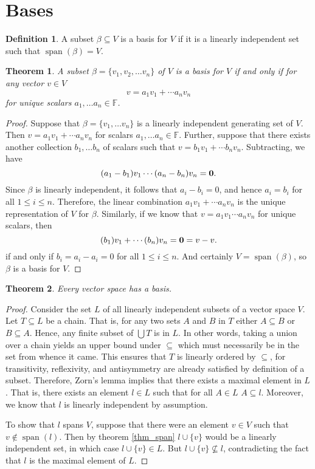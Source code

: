 \documentclass[oneside, 12pt]{book}
\DeclareMathOperator{\spn}{span}
\newtheorem{thm}{Theorem}[section]
\theoremstyle{definition}
\newtheorem{defn}{Definition}[section]
\begin{document}
\section{Bases}
\begin{defn}
\label{defn_basis}
A subset $\beta \subseteq V $ is a basis for $V$ if it is a linearly independent set such that $\spn(\beta)=V$.
\end{defn}
\begin{thm}
\label{thm_uniqbas}
A subset $\beta=\{v_{1},v_{2}, \dots v_{n}\}$ of $V$ is a basis for $V$ if and only if for any vector $v \in V$ \[v=a_{1}v_{1}+\cdots a_{n}v_{n}\] for unique scalars $a_{1}, \dots a_{n} \in \mathbb{F}$.
\end{thm}
\begin{proof}
Suppose that $\beta=\{v_{1}, \dots v_{n}\}$ is a linearly independent generating set of $V$. Then $v=a_{1}v_{1}+\cdots a_{n}v_{n}$ for scalars $a_{1}, \dots a_{n} \in \mathbb{F}$. Further, suppose that there exists another collection $b_{1}, \dots b_{n}$ of scalars such that $v=b_{1}v_{1}+\cdots b_{n}v_{n}$. Subtracting, we have \[(a_{1}-b_{1})v_{1}\cdots (a_{n}-b_{n})v_{n}=\bold{0}.\] Since $\beta$ is linearly independent, it follows that $a_{i}-b_{i}=0$, and hence $a_{i}=b_{i}$ for all $1 \leq i\leq n$. Therefore, the linear combination $a_{1}v_{1}+\cdots a_{n}v_{n}$ is the unique representation of $V$ for $\beta$. Similarly, if we know that $v=a_{1}v_{1}\cdots a_{n}v_{n}$ for unique scalars, then \[(b_{1})v_{1}+\cdots(b_{n})v_{n}=\bold{0}=v-v.\] if and only if $b_{i}=a_{i}-a_{i}=0$ for all $1 \leq i \leq n$. And certainly $V=\spn(\beta)$, so $\beta$ is a basis for $V$.
\end{proof}
\begin{thm}
\label{thm_basis}
Every vector space has a basis.
\end{thm}
\begin{proof}
  Consider the set $L$ of all linearly independent subsets of a vector space $V$. Let $T \subseteq L$ be a chain. That is, for any two sets $A$ and $B$ in $T$ either $A \subseteq B$ or $B \subseteq A$. Hence, any finite subset of $\bigcup T$ is in $L$. In other words, taking a union over a chain yields an upper bound under $\subseteq$ which must necessarily be in the set from whence it came. This ensures that $T$ is linearly ordered by $\subseteq$, for transitivity, reflexivity, and antisymmetry are already satisfied by definition of a subset. Therefore, Zorn's lemma implies that there exists a maximal element in $L$. That is, there exists an element $l \in L$ such that for all $A \in L$ $A \subseteq l$. Moreover, we know that $l$ is linearly independent by assumption.

  To show that $l$ spans $V$, suppose that there were an element $v \in V$ such that $v\notin \spn(l)$. Then by theorem \ref{thm_span} $l \cup \{v\}$ would be a linearly independent set, in which case $l \cup \{v\} \in L $. But $l \cup \{v \} \nsubseteq l$, contradicting the fact that $l$ is the maximal element of $L$.
\end{proof}
\end{document}
